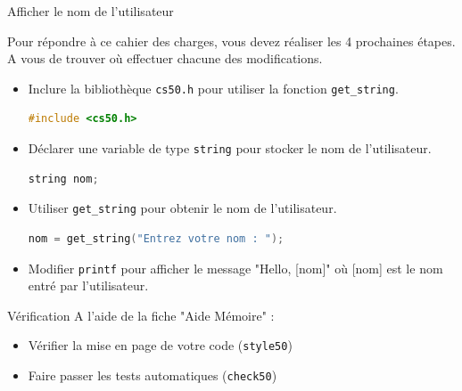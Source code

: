 \begin{UPSTIManipulation}{Afficher le nom de l'utilisateur}

	Pour répondre à ce cahier des charges, vous devez réaliser les 4 prochaines étapes. A vous de trouver où effectuer chacune des modifications.
	\begin{itemize}
		\item[$\Box$] Inclure la bibliothèque \texttt{cs50.h} pour utiliser la fonction \texttt{get\_string}.
		      \begin{lstlisting}[language=c]
	#include <cs50.h>
\end{lstlisting}
		\item[$\Box$] Déclarer une variable de type \texttt{string} pour stocker le nom de l'utilisateur.
		      \begin{lstlisting}[language=c]
	string nom;
\end{lstlisting}
		\item[$\Box$] Utiliser \texttt{get\_string} pour obtenir le nom de l'utilisateur.
		      \begin{lstlisting}[language=c]
	nom = get_string("Entrez votre nom : ");
\end{lstlisting}
		\item[$\Box$] Modifier \texttt{printf} pour afficher le message "Hello, [nom]" où [nom] est le nom entré par l'utilisateur.
	\end{itemize}
\end{UPSTIManipulation}


\begin{UPSTIManipulation}{Vérification}
	A l'aide de la fiche "Aide Mémoire" :
	\begin{itemize}
		\item[$\Box$] Vérifier la mise en page de votre code (\texttt{style50})
		\item[$\Box$] Faire passer les tests automatiques (\texttt{check50})
	\end{itemize}
\end{UPSTIManipulation}



